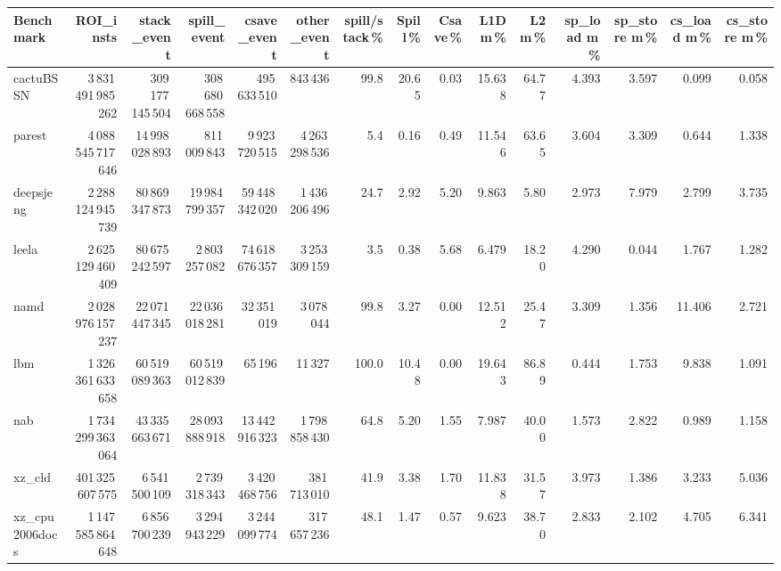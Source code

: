 \documentclass[9pt,landscape,a4paper]{article}
\begin{document}
\vspace{2mm}
\centering
\begin{adjustbox}{max width=\textwidth, max totalheight=0.50\textheight}%
\begin{tabular}{lrrrrrrrrrrrrrr}
\toprule
Benchmark & ROI\_insts & stack\_event & \textbf{spill\_event} & csave\_event & other\_event & spill/stack\,\% & Spill\,\% & Csave\,\% & L1D m\,\% & L2 m\,\% & sp\_load m\,\% & sp\_store m\,\% & cs\_load m\,\% & cs\_store m\,\% \\
\midrule
cactuBSSN & 3\,831\,491\,985\,262 & 309\,177\,145\,504 & 308\,680\,668\,558 & 495\,633\,510 & 843\,436 & 99.8 & 20.65 & 0.03 & 15.638 & 64.77 & 4.393 & 3.597 & 0.099 & 0.058 \\
parest & 4\,088\,545\,717\,646 & 14\,998\,028\,893 & 811\,009\,843 & 9\,923\,720\,515 & 4\,263\,298\,536 & 5.4 & 0.16 & 0.49 & 11.546 & 63.65 & 3.604 & 3.309 & 0.644 & 1.338 \\
deepsjeng & 2\,288\,124\,945\,739 & 80\,869\,347\,873 & 19\,984\,799\,357 & 59\,448\,342\,020 & 1\,436\,206\,496 & 24.7 & 2.92 & 5.20 & 9.863 & 5.80 & 2.973 & 7.979 & 2.799 & 3.735 \\
leela & 2\,625\,129\,460\,409 & 80\,675\,242\,597 & 2\,803\,257\,082 & 74\,618\,676\,357 & 3\,253\,309\,159 & 3.5 & 0.38 & 5.68 & 6.479 & 18.20 & 4.290 & 0.044 & 1.767 & 1.282 \\
namd & 2\,028\,976\,157\,237 & 22\,071\,447\,345 & 22\,036\,018\,281 & 32\,351\,019 & 3\,078\,044 & 99.8 & 3.27 & 0.00 & 12.512 & 25.47 & 3.309 & 1.356 & 11.406 & 2.721 \\
lbm & 1\,326\,361\,633\,658 & 60\,519\,089\,363 & 60\,519\,012\,839 & 65\,196 & 11\,327 & 100.0 & 10.48 & 0.00 & 19.643 & 86.89 & 0.444 & 1.753 & 9.838 & 1.091 \\
nab & 1\,734\,299\,363\,064 & 43\,335\,663\,671 & 28\,093\,888\,918 & 13\,442\,916\,323 & 1\,798\,858\,430 & 64.8 & 5.20 & 1.55 & 7.987 & 40.00 & 1.573 & 2.822 & 0.989 & 1.158 \\
xz\_cld & 401\,325\,607\,575 & 6\,541\,500\,109 & 2\,739\,318\,343 & 3\,420\,468\,756 & 381\,713\,010 & 41.9 & 3.38 & 1.70 & 11.838 & 31.57 & 3.973 & 1.386 & 3.233 & 5.036 \\
xz\_cpu2006docs & 1\,147\,585\,864\,648 & 6\,856\,700\,239 & 3\,294\,943\,229 & 3\,244\,099\,774 & 317\,657\,236 & 48.1 & 1.47 & 0.57 & 9.623 & 38.70 & 2.833 & 2.102 & 4.705 & 6.341 \\

\end{tabular}
\end{adjustbox}
\end{document}
